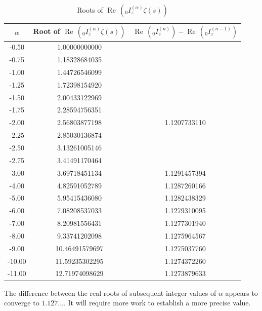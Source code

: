 \documentclass[a4paper,11pt,twoside]{amsart}
\renewcommand\Re{{\operatorname{Re\,}}}
\begin{document}
\begin{table}[H]
  \begin{center}
    \caption{Roots of $\Re({}_0 I_z^{(\alpha)} \zeta(s))$}
    \label{tab:table5}
    \begin{tabular}{c|c|c} 
      $\alpha$ & Root of $\Re({}_0 I_z^{(\alpha)} \zeta(s))$ & $\Re({}_0 I_z^{(n)})-\Re({}_0 I_z^{(n-1)})$\\
      \hline
      -0.50 & 1.00000000000 & \\
      -0.75 & 1.18328684035 & \\
      -1.00 & 1.44726546099 & \\
      -1.25 & 1.72398154920 & \\
      -1.50 & 2.00433122969 & \\
      -1.75 & 2.28594756351 & \\
      -2.00 & 2.56803877198 & 1.1207733110 \\
      -2.25 & 2.85030136874 & \\
      -2.50 & 3.13261005146 & \\
      -2.75 & 3.41491170464 & \\
      -3.00 & 3.69718451134 & 1.1291457394 \\
      -4.00 & 4.82591052789 & 1.1287260166 \\
      -5.00 & 5.95415436080 & 1.1282438329 \\
      -6.00 & 7.08208537033 & 1.1279310095\\
      -7.00 & 8.20981556431 & 1.1277301940\\
      -8.00 & 9.33741202098 & 1.1275964567\\
      -9.00 &10.46491579697 & 1.1275037760\\
     -10.00 &11.59235302295 & 1.1274372260\\
     -11.00 &12.71974098629 & 1.1273879633\\
    \end{tabular}
  \end{center}
\end{table}
The difference between the real roots of subsequent integer values of $\alpha$ appears to converge to $1.127...$. It will require more work to establish a more precise value.
\end{document}
